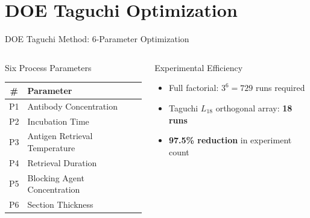 \documentclass[aspectratio=169,10pt]{beamer}
\begin{document}
\section{DOE Taguchi Optimization}
\begin{frame}{DOE Taguchi Method: 6-Parameter Optimization}
  \begin{columns}[T]
      \begin{block}{Six Process Parameters}
        \footnotesize
        \begin{tabular}{@{}cl@{}}
          \toprule
          \# & Parameter \\
          \midrule
          P1 & Antibody Concentration \\
          P2 & Incubation Time \\
          P3 & Antigen Retrieval Temperature \\
          P4 & Retrieval Duration \\
          P5 & Blocking Agent Concentration \\
          P6 & Section Thickness \\
          \bottomrule
        \end{tabular}
      \end{block}
      \vspace{0.1cm}
      \begin{block}{Experimental Efficiency}
        \small
        \begin{itemize}
          \item Full factorial: $3^{6} = 729$ runs required
          \item Taguchi $L_{18}$ orthogonal array: \textbf{18 runs}
          \item \textbf{97.5\% reduction} in experiment count
        \end{itemize}
      \end{block}


\end{columns}
\end{frame}
\end{document}
